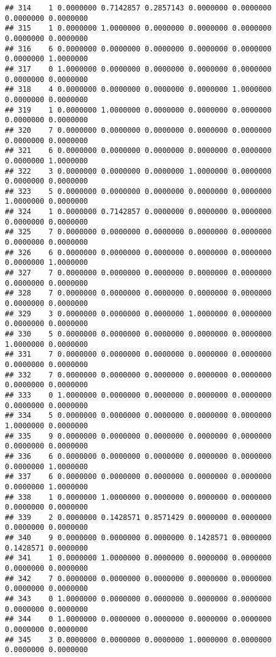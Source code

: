 \documentclass[
]{article}
\begin{document}
\begin{verbatim}
## 314    1 0.0000000 0.7142857 0.2857143 0.0000000 0.0000000 0.0000000 0.0000000
## 315    1 0.0000000 1.0000000 0.0000000 0.0000000 0.0000000 0.0000000 0.0000000
## 316    6 0.0000000 0.0000000 0.0000000 0.0000000 0.0000000 0.0000000 1.0000000
## 317    0 1.0000000 0.0000000 0.0000000 0.0000000 0.0000000 0.0000000 0.0000000
## 318    4 0.0000000 0.0000000 0.0000000 0.0000000 1.0000000 0.0000000 0.0000000
## 319    1 0.0000000 1.0000000 0.0000000 0.0000000 0.0000000 0.0000000 0.0000000
## 320    7 0.0000000 0.0000000 0.0000000 0.0000000 0.0000000 0.0000000 0.0000000
## 321    6 0.0000000 0.0000000 0.0000000 0.0000000 0.0000000 0.0000000 1.0000000
## 322    3 0.0000000 0.0000000 0.0000000 1.0000000 0.0000000 0.0000000 0.0000000
## 323    5 0.0000000 0.0000000 0.0000000 0.0000000 0.0000000 1.0000000 0.0000000
## 324    1 0.0000000 0.7142857 0.0000000 0.0000000 0.0000000 0.0000000 0.0000000
## 325    7 0.0000000 0.0000000 0.0000000 0.0000000 0.0000000 0.0000000 0.0000000
## 326    6 0.0000000 0.0000000 0.0000000 0.0000000 0.0000000 0.0000000 1.0000000
## 327    7 0.0000000 0.0000000 0.0000000 0.0000000 0.0000000 0.0000000 0.0000000
## 328    7 0.0000000 0.0000000 0.0000000 0.0000000 0.0000000 0.0000000 0.0000000
## 329    3 0.0000000 0.0000000 0.0000000 1.0000000 0.0000000 0.0000000 0.0000000
## 330    5 0.0000000 0.0000000 0.0000000 0.0000000 0.0000000 1.0000000 0.0000000
## 331    7 0.0000000 0.0000000 0.0000000 0.0000000 0.0000000 0.0000000 0.0000000
## 332    7 0.0000000 0.0000000 0.0000000 0.0000000 0.0000000 0.0000000 0.0000000
## 333    0 1.0000000 0.0000000 0.0000000 0.0000000 0.0000000 0.0000000 0.0000000
## 334    5 0.0000000 0.0000000 0.0000000 0.0000000 0.0000000 1.0000000 0.0000000
## 335    9 0.0000000 0.0000000 0.0000000 0.0000000 0.0000000 0.0000000 0.0000000
## 336    6 0.0000000 0.0000000 0.0000000 0.0000000 0.0000000 0.0000000 1.0000000
## 337    6 0.0000000 0.0000000 0.0000000 0.0000000 0.0000000 0.0000000 1.0000000
## 338    1 0.0000000 1.0000000 0.0000000 0.0000000 0.0000000 0.0000000 0.0000000
## 339    2 0.0000000 0.1428571 0.8571429 0.0000000 0.0000000 0.0000000 0.0000000
## 340    9 0.0000000 0.0000000 0.0000000 0.1428571 0.0000000 0.1428571 0.0000000
## 341    1 0.0000000 1.0000000 0.0000000 0.0000000 0.0000000 0.0000000 0.0000000
## 342    7 0.0000000 0.0000000 0.0000000 0.0000000 0.0000000 0.0000000 0.0000000
## 343    0 1.0000000 0.0000000 0.0000000 0.0000000 0.0000000 0.0000000 0.0000000
## 344    0 1.0000000 0.0000000 0.0000000 0.0000000 0.0000000 0.0000000 0.0000000
## 345    3 0.0000000 0.0000000 0.0000000 1.0000000 0.0000000 0.0000000 0.0000000

\end{verbatim}
\end{document}
